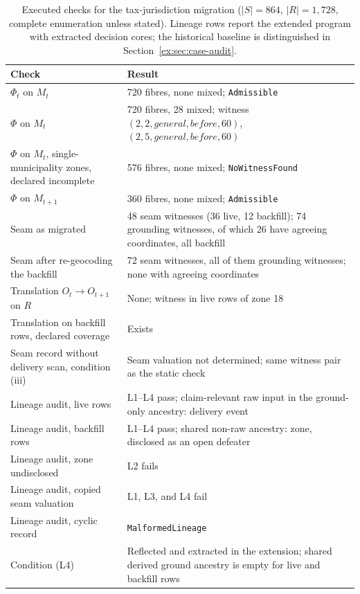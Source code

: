 \documentclass[smallextended,envcountsect,envcountsame,natbib]{svjour3}
\newcommand{\code}[1]{\texttt{#1}}
\begin{document}
\begin{table}[htbp]
\centering
\small
\caption{Executed checks for the tax-jurisdiction migration ($|S|=864$, $|R|=1{,}728$, complete enumeration unless stated). Lineage rows report the extended program with extracted decision cores; the historical baseline is distinguished in Section~\ref{ex:sec:case-audit}.}
\label{ex:tab:case-results-full}
\begin{tabularx}{\textwidth}{@{}p{4.8cm}L@{}}
\toprule
Check & Result \\
\midrule
$\Phi_t$ on $M_t$ & 720 fibres, none mixed; \code{Admissible} \\
$\Phi$ on $M_t$ & 720 fibres, 28 mixed; witness $(2,2,\mathit{general},\mathit{before},60)$, $(2,5,\mathit{general},\mathit{before},60)$ \\
$\Phi$ on $M_t$, single-municipality zones, declared incomplete & 576 fibres, none mixed; \code{NoWitnessFound} \\
$\Phi$ on $M_{t+1}$ & 360 fibres, none mixed; \code{Admissible} \\
Seam as migrated & 48 seam witnesses (36 live, 12 backfill); 74 grounding witnesses, of which 26 have agreeing coordinates, all backfill \\
Seam after re-geocoding the backfill & 72 seam witnesses, all of them grounding witnesses; none with agreeing coordinates \\
Translation $O_t \to O_{t+1}$ on $R$ & None; witness in live rows of zone 18 \\
Translation on backfill rows, declared coverage & Exists \\
Seam record without delivery scan, condition (iii) & Seam valuation not determined; same witness pair as the static check \\
Lineage audit, live rows & L1--L4 pass; claim-relevant raw input in the ground-only ancestry: delivery event \\
Lineage audit, backfill rows & L1--L4 pass; shared non-raw ancestry: zone, disclosed as an open defeater \\
Lineage audit, zone undisclosed & L2 fails \\
Lineage audit, copied seam valuation & L1, L3, and L4 fail \\
Lineage audit, cyclic record & \code{MalformedLineage} \\
Condition (L4) & Reflected and extracted in the extension; shared derived ground ancestry is empty for live and backfill rows \\
\bottomrule
\end{tabularx}
\end{table}
\end{document}
